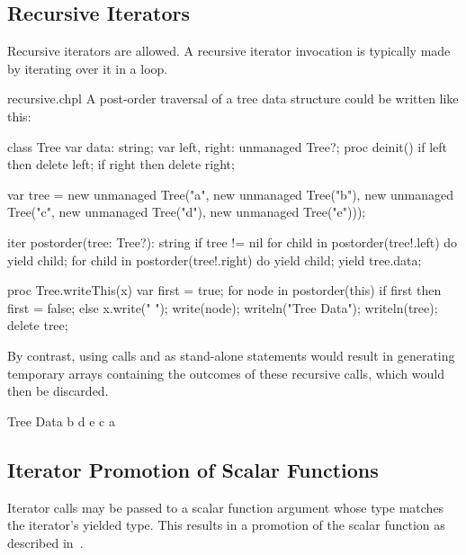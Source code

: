 \subsection{Recursive Iterators}
\label{Recursive_Iterators}

Recursive iterators are allowed. A recursive iterator invocation is
typically made by iterating over it in a loop.


\begin{chapelexample}{recursive.chpl}
A post-order traversal of a tree data structure could be written like this:
\begin{chapelnoprint}
class Tree {
  var data: string;
  var left, right: unmanaged Tree?;
  proc deinit() {
    if left then delete left;
    if right then delete right;
  }
}

var tree = new unmanaged Tree("a", new unmanaged Tree("b"), new unmanaged Tree("c", new unmanaged Tree("d"), new unmanaged Tree("e")));
\end{chapelnoprint}
\begin{chapel}
iter postorder(tree: Tree?): string {
  if tree != nil {
    for child in postorder(tree!.left) do
      yield child;
    for child in postorder(tree!.right) do
      yield child;
    yield tree.data;
  }
}
\end{chapel}
\begin{chapelnoprint}
proc Tree.writeThis(x)
{
  var first = true;
  for node in postorder(this) {
    if first then first = false;
      else x.write(" ");
    write(node);
  }
}
writeln("Tree Data");
writeln(tree);
delete tree;
\end{chapelnoprint}
By contrast, using calls 
and  as stand-alone statements would
result in generating temporary arrays containing the outcomes of these
recursive calls, which would then be discarded.
\begin{chapeloutput}
Tree Data
b d e c a
\end{chapeloutput}
\end{chapelexample}

\subsection{Iterator Promotion of Scalar Functions}
\label{Iterator_Promotion_of_Scalar_Functions}

Iterator calls may be passed to a scalar function argument whose type
matches the iterator's yielded type.  This results in a promotion of the
scalar function as described in~.


